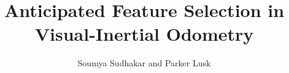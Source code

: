 \documentclass[letterpaper, 10 pt, conference]{ieeeconf}
\begin{document}
\title{Anticipated Feature Selection in Visual-Inertial Odometry}
\author{Soumya Sudhakar and Parker Lusk}
\maketitle






\end{document}
